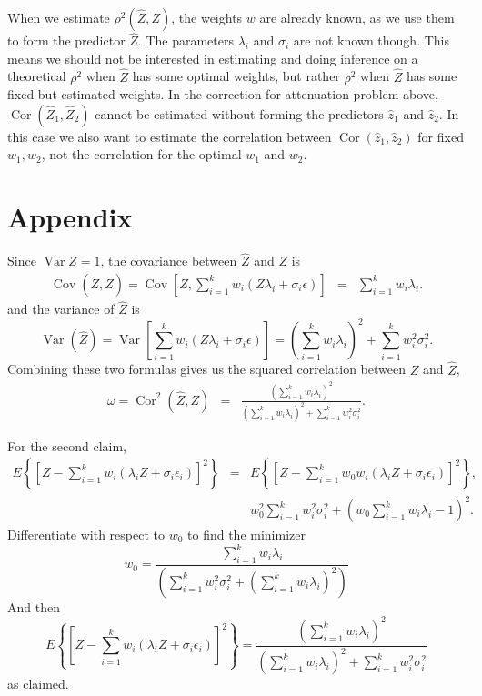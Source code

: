 \documentclass{article}
\makeatletter
\theoremstyle{plain}
\theoremstyle{plain}
\theoremstyle{definition}
\theoremstyle{remark}
\theoremstyle{definition}
\theoremstyle{plain}
\theoremstyle{plain}
\theoremstyle{definition}
\newenvironment{proof}[1][\protect\proofname]{\par
	\normalfont\topsep6\p@\@plus6\p@\relax
	\trivlist
	\itemindent\parindent
	\item[\hskip\labelsep\scshape #1]\ignorespaces
}{%
	\endtrivlist\@endpefalse
}
\providecommand{\proofname}{Proof}
\DeclareMathOperator{\Var}{Var}
\DeclareMathOperator{\Cor}{Cor}
\DeclareMathOperator{\Cov}{Cov}
\makeatother
\begin{document}
When we estimate $\rho^{2}(\widehat{Z},Z)$, the weights
$w$ are already known, as we use them to form the predictor $\widehat{Z}$.
The parameters $\lambda_{i}$ and $\sigma_{i}$ are not known though.
This means we should not be interested in estimating and doing inference
on a theoretical $\rho^{2}$ when $\widehat{Z}$ has some optimal
weights, but rather $\rho^{2}$ when $\widehat{Z}$ has some fixed
but estimated weights. In the correction for attenuation problem
above, $\Cor(\widehat{Z}_{1},\widehat{Z}_{2})$ cannot
be estimated without forming the predictors $\widehat{z}_{1}$ and
$\widehat{z}_{2}$. In this case we also want to estimate the correlation
between $\Cor(\widehat{z}_{1},\widehat{z}_{2})$ for fixed
$w_{1},w_{2}$, not the correlation for the optimal $w_{1}$ and $w_{2}$.

\section{Appendix}

\begin{proof}[Proof of Proposition \ref{prop:reliability motivation}]\label{proof:reliability motivation}
Since $\Var Z=1$, the covariance between $\widehat{Z}$ and $Z$
is
\begin{eqnarray*}
\Cov\left(Z,\widehat{Z}\right)=\Cov\left[Z,\sum_{i=1}^{k}w_{i}\left(Z\lambda_{i}+\sigma_{i}\epsilon\right)\right] & = & \sum_{i=1}^{k}w_{i}\lambda_{i}.
\end{eqnarray*}
and the variance of $\widehat{Z}$ is
\[
\Var\left(\widehat{Z}\right)=\Var\left[\sum_{i=1}^{k}w_{i}\left(Z\lambda_{i}+\sigma_{i}\epsilon\right)\right]=\left(\sum_{i=1}^{k}w_{i}\lambda_{i}\right)^{2}+\sum_{i=1}^{k}w_{i}^{2}\sigma_{i}^{2}.
\]
Combining these two formulas gives us the squared correlation between
$Z$ and $\widehat{Z}$,
\begin{eqnarray*}
\omega=\Cor^{2}\left(\widehat{Z},Z\right) & = & \frac{\left(\sum_{i=1}^{k}w_{i}\lambda_{i}\right)^{2}}{\left(\sum_{i=1}^{k}w_{i}\lambda_{i}\right)^{2}+\sum_{i=1}^{k}w_{i}^{2}\sigma_{i}^{2}}.
\end{eqnarray*}

For the second claim,
\begin{eqnarray*}
E\left\{ \left[Z-\sum_{i=1}^{k}w_{i}\left(\lambda_{i}Z+\sigma_{i}\epsilon_{i}\right)\right]^{2}\right\}  & = & E\left\{ \left[Z-\sum_{i=1}^{k}w_{0}w_{i}\left(\lambda_{i}Z+\sigma_{i}\epsilon_{i}\right)\right]^{2}\right\} ,\\
 &  & w_{0}^{2}\sum_{i=1}^{k}w_{i}^{2}\sigma_{i}^{2}+\left(w_{0}\sum_{i=1}^{k}w_{i}\lambda_{i}-1\right)^{2}.
\end{eqnarray*}
Differentiate with respect to $w_{0}$ to find the minimizer
\[
w_{0}=\frac{\sum_{i=1}^{k}w_{i}\lambda_{i}}{\left(\sum_{i=1}^{k}w_{i}^{2}\sigma_{i}^{2}+\left(\sum_{i=1}^{k}w_{i}\lambda_{i}\right)^{2}\right)}
\]
And then
\[
E\left\{ \left[Z-\sum_{i=1}^{k}w_{i}\left(\lambda_{i}Z+\sigma_{i}\epsilon_{i}\right)\right]^{2}\right\} =\frac{\left(\sum_{i=1}^{k}w_{i}\lambda_{i}\right)^{2}}{\left(\sum_{i=1}^{k}w_{i}\lambda_{i}\right)^{2}+\sum_{i=1}^{k}w_{i}^{2}\sigma_{i}^{2}}
\]
as claimed.
\end{proof}
\end{document}
